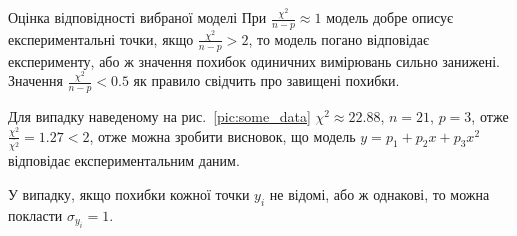 \documentclass{LabBook}
\begin{document}
  \begin{More}{Оцінка відповідності вибраної моделі}
    При $\frac{\chi^2}{n-p} \approx 1$ модель добре описує експериментальні точки, якщо $\frac{\chi^2}{n-p} > 2$, то модель погано відповідає експерименту, або ж значення похибок одиничних вимірювань сильно занижені.
    Значення $\frac{\chi^2}{n-p} < 0.5$ як правило свідчить про завищені похибки.
  \end{More}

  Для випадку наведеному на рис.~\ref{pic:some_data} $\chi^2 \approx 22.88$, $n = 21$, $ p = 3$, отже $\frac{\chi^2}{\overline{\chi^2}} = 1.27 < 2$, отже можна зробити висновок, що модель $y = p_1 + p_2 x + p_3 x^2$ відповідає експериментальним даним.

  У випадку, якщо похибки кожної точки $y_i$ не відомі, або ж однакові, то можна покласти $\sigma_{y_i} = 1$.
\end{document}
